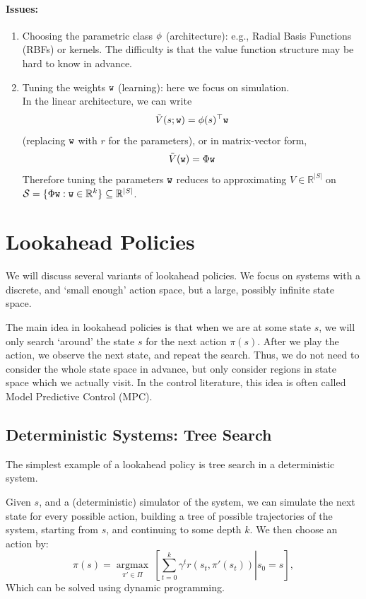 \begin{enumerate}
\paragraph{Issues:}
\begin{enumerate}
\item Choosing the parametric class $\phi$ (architecture): e.g., Radial Basis Functions (RBFs) or kernels. The difficulty is that the value function structure may be hard to know in advance.
\item Tuning the weights $\texttt{w}$ (learning): here we focus on simulation.\\
In the linear architecture, we can write
$$\tilde{V}(s;\texttt{w})=\phi(s)^\top \texttt{w}$$
(replacing $\texttt{w}$ with $r$ for the parameters), or in matrix-vector form,
$$\tilde{ {V}}( {\texttt{w}}) =  { {\Phi}} { \texttt{w}}$$
Therefore tuning the parameters $ {\texttt{w}}$ reduces to approximating $ {V} \in \mathbb{R}^{|S|}$ on $\mathcal{S}=\{  { {\Phi}} {\texttt{w}}:  {\texttt{w}} \in \mathbb{R}^k\} \subseteq  \mathbb{R}^{|S|} $.

\end{enumerate}

\end{enumerate}

\section{Lookahead Policies}

We will discuss several variants of lookahead policies. We focus on systems with a discrete, and `small enough' action space, but a large, possibly infinite state space.

The main idea in lookahead policies is that when we are at some state $s$, we will only search `around' the state $s$ for the next action $\pi(s)$. After we play the action, we observe the next state, and repeat the search.
Thus, we do not need to consider the whole state space in advance, but only consider regions in state space which we actually visit.
In the control literature, this idea is often called Model Predictive Control (MPC).

\subsection{Deterministic Systems: Tree Search}
The simplest example of a lookahead policy is tree search in a deterministic system.

Given $s$, and a (deterministic) simulator of the system, we can simulate the next state for every possible action, building a tree of possible trajectories of the system, starting from $s$, and continuing to some depth $k$. 
We then choose an action by:
$$\pi(s) = \underset{\pi' \in \Pi}{\operatorname{argmax}}\  \left[\left.\sum_{t=0}^{k} \gamma^t r(s_{t},{\pi'}(s_{t})) \right| s_0 = s\right],$$
Which can be solved using dynamic programming.

